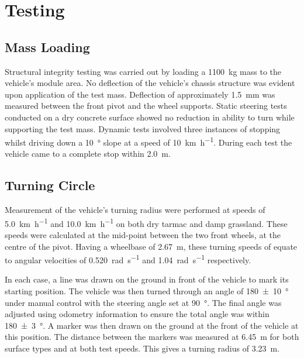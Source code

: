 \documentclass[preprint,authoryear,12pt]{elsarticle}
\begin{document}
\section{Testing}
\label{sub:testing}

  \subsection{Mass Loading}
    Structural integrity testing was carried out by loading a \SI{1100}{\kilo\gram} mass to the vehicle's module area.
    No deflection of the vehicle's chassis structure was evident upon application of the test mass.
    Deflection of approximately \SI{1.5}{\milli\meter} was measured between the front pivot and the wheel supports.
    Static steering tests conducted on a dry concrete surface showed no reduction in ability to turn while supporting the test mass.
    Dynamic tests involved three instances of stopping whilst driving down a \SI{10}{\degree} slope at a speed of \SI{10}{\kilo\meter\per\hour}.
    During each test the vehicle came to a complete stop within \SI{2.0}{\meter}.

  \subsection{Turning Circle}

    Measurement of the vehicle's turning radius were performed at speeds of \SI{5.0}{\kilo\meter\per\hour} and \SI{10.0}{\kilo\meter\per\hour} on both dry tarmac and damp grassland.
    These speeds were calculated at the mid-point between the two front wheels, at the centre of the pivot.
    Having a wheelbase of \SI{2.67}{\meter}, these turning speeds of equate to angular velocities of \SI{0.520}{\radian\per\second} and \SI{1.04}{\radian\per\second} respectively.

    In each case, a line was drawn on the ground in front of the vehicle to mark its starting position.
    The vehicle was then turned through an angle of \SI[separate-uncertainty=true]{180(10)}{\degree} under manual control with the steering angle set at \SI{90}{\degree}.
    The final angle was adjusted using odometry information to ensure the total angle was within \SI[separate-uncertainty=true]{180(3)}{\degree}.
    A marker was then drawn on the ground at the front of the vehicle at this position.
    The distance between the markers was measured at \SI{6.45}{\meter} for both surface types and at both test speeds.
    This gives a turning radius of \SI{3.23}{\meter}.
\end{document}

